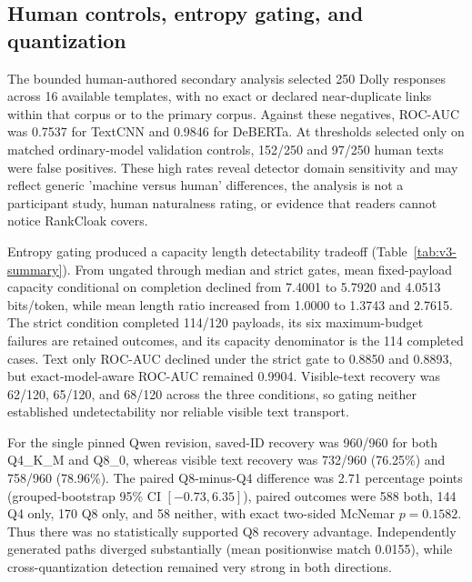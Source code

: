 \documentclass[fleqn,10pt]{wlscirep}
\begin{document}
\subsection*{Human controls, entropy gating, and quantization}\label{sec:results-v3}

The bounded human-authored secondary analysis selected 250 Dolly responses across 16 available templates, with no exact or declared near-duplicate links within that corpus or to the primary corpus. Against these negatives, ROC-AUC was 0.7537 for TextCNN and 0.9846 for DeBERTa. At thresholds selected only on matched ordinary-model validation controls, 152/250 and 97/250 human texts were false positives. These high rates reveal detector domain sensitivity and may reflect generic 'machine versus human' differences, the analysis is not a participant study, human naturalness rating, or evidence that readers cannot notice RankCloak covers.

Entropy gating produced a capacity length detectability tradeoff (Table~\ref{tab:v3-summary}). From ungated through median and strict gates, mean fixed-payload capacity conditional on completion declined from 7.4001 to 5.7920 and 4.0513 bits/token, while mean length ratio increased from 1.0000 to 1.3743 and 2.7615. The strict condition completed 114/120 payloads, its six maximum-budget failures are retained outcomes, and its capacity denominator is the 114 completed cases. Text only ROC-AUC declined under the strict gate to 0.8850 and 0.8893, but exact-model-aware ROC-AUC remained 0.9904. Visible-text recovery was 62/120, 65/120, and 68/120 across the three conditions, so gating neither established undetectability nor reliable visible text transport.

For the single pinned Qwen revision, saved-ID recovery was 960/960 for both Q4\_K\_M and Q8\_0, whereas visible text recovery was 732/960 (76.25\%) and 758/960 (78.96\%). The paired Q8-minus-Q4 difference was 2.71 percentage points (grouped-bootstrap 95\% CI \([-0.73,6.35]\)), paired outcomes were 588 both, 144 Q4 only, 170 Q8 only, and 58 neither, with exact two-sided McNemar \(p=0.1582\). Thus there was no statistically supported Q8 recovery advantage. Independently generated paths diverged substantially (mean positionwise match 0.0155), while cross-quantization detection remained very strong in both directions.
\end{document}
